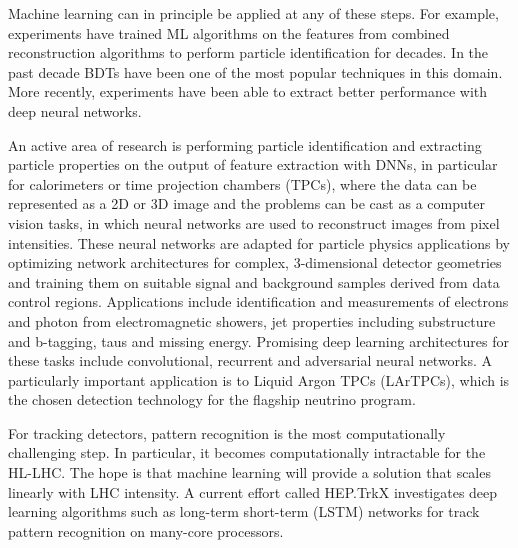 
Machine learning can in principle be applied at any of these steps. For example, experiments have trained ML algorithms on the features from combined reconstruction algorithms to perform particle identification for decades. In the past decade BDTs have been one of the most popular techniques in this domain. More recently, experiments have been able to extract better performance with deep neural networks.


An active area of research is performing particle identification and extracting particle properties on the output of feature extraction with DNNs, in particular for calorimeters or time projection chambers (TPCs), where the data can be represented as a 2D or 3D image and the problems can be cast as a computer vision tasks, in which neural networks are used to reconstruct images from pixel intensities. These neural networks are adapted for particle physics applications by optimizing network architectures for complex, 3-dimensional detector geometries and training them on suitable signal and background samples derived from data control regions. Applications include identification and measurements of electrons and photon from electromagnetic showers, jet properties including substructure and b-tagging, taus and missing energy. Promising deep learning architectures for these tasks include convolutional, recurrent and adversarial neural networks. A particularly important application is to Liquid Argon TPCs (LArTPCs), which is the chosen detection technology for the flagship neutrino program. %

For tracking detectors, pattern recognition is the most computationally challenging step. In particular, it becomes computationally intractable for the HL-LHC. The hope is that machine learning will provide a solution that scales linearly with LHC intensity. A current effort called HEP.TrkX investigates deep learning algorithms such as long-term short-term (LSTM) networks for track pattern recognition on many-core processors.

